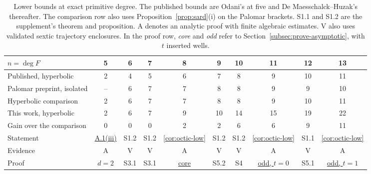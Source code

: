 \begin{table}[htbp]
\centering\small
\caption{Lower bounds at exact primitive degree. The published bounds are
Odani's at five and De Maesschalck--Huzak's thereafter. The comparison
row also uses Proposition~\ref{prop:sard}(i) on the Palomar brackets.
S1.1 and S1.2 are the supplement's theorem and proposition.
A denotes an analytic proof with finite algebraic estimates.
V also uses validated sextic trajectory enclosures. In the proof row,
\emph{core} and \emph{odd} refer to Section~\ref{subsec:prove-asymptotic},
with $t$ inserted wells.}\label{tab:exact-degrees}
\smallskip\setlength{\tabcolsep}{3.5pt}
\begin{tabular}{@{}l*{9}{c}@{}}
\toprule
$n=\deg F$ &5&6&7&8&9&10&11&12&13\\
\midrule
Published, hyperbolic&2&4&5&6&7&8&9&10&11\\
Palomar preprint, isolated&--&6&7&7&8&8&9&9&10\\
Hyperbolic comparison&2&6&7&7&8&8&9&10&11\\
This work, hyperbolic&2&6&7&9&10&14&15&19&22\\
Gain over the comparison&0&0&0&2&2&6&6&9&11\\
\addlinespace
Statement&\hyperref[thm:weak]{A.1(iii)}&S1.2&S1.2&\ref{cor:octic-low}&S1.2&S1.2&\ref{cor:octic-low}&S1.1&\ref{cor:octic-low}\\
Evidence&A&V&V&A&V&V&A&V&A\\
Proof&$d=2$&S3.1&S3.1&\hyperlink{octic-core}{core}&S5.2&S4&\hyperlink{odd-closure}{odd, $t=0$}&S5.1&\hyperlink{odd-closure}{odd, $t=1$}\\
\bottomrule
\end{tabular}
\end{table}
